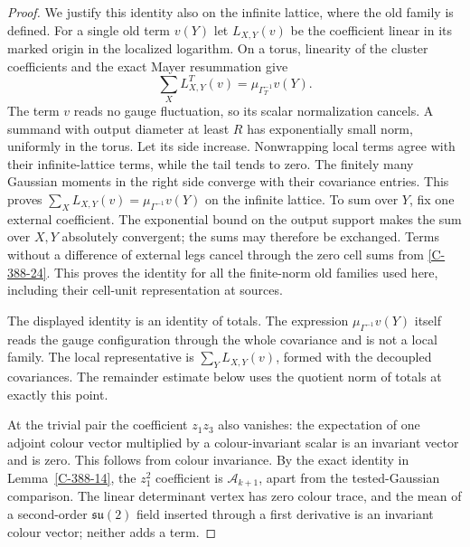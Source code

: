 \documentclass[11pt,letterpaper,reqno]{amsart}
\theoremstyle{definition}
\theoremstyle{remark}
\begin{document}
\begin{proof}
We justify this identity also on the infinite lattice,
where the old family is defined.  For a single old term
$v(Y)$ let $L_{X,Y}(v)$ be the coefficient linear in its
marked origin in the localized logarithm.  On a torus,
linearity of the cluster coefficients and the exact
Mayer resummation give
\[
 \sum_XL^T_{X,Y}(v)=\mu_{\Gamma_T^{-1}}v(Y).
\]
The term $v$ reads no gauge fluctuation, so its scalar
normalization cancels.  A summand with output diameter
at least $R$ has exponentially small norm, uniformly
in the torus.  Let its side increase.  Nonwrapping
local terms agree with their infinite-lattice terms,
while the tail tends to zero.  The finitely many
Gaussian moments in the right side converge with
their covariance entries.  This proves
$\sum_XL_{X,Y}(v)=\mu_{\Gamma^{-1}}v(Y)$ on the
infinite lattice.  To sum over $Y$, fix one external
coefficient.  The exponential bound on the output
support makes the sum over $X,Y$ absolutely convergent;
the sums may therefore be exchanged.  Terms without
a difference of external legs cancel through the
zero cell sums from \cref{C-388-24}.  This proves the
identity for all the finite-norm old families used here,
including their cell-unit representation at sources.

The displayed identity is an identity of totals.
The expression $\mu_{\Gamma^{-1}}v(Y)$ itself reads
the gauge configuration through the whole covariance
and is not a local family.  The local representative
is $\sum_YL_{X,Y}(v)$, formed with the decoupled
covariances.  The remainder estimate below uses the
quotient norm of totals at exactly this point.

At the trivial pair the coefficient $z_1z_3$ also vanishes:
the expectation of one adjoint colour vector multiplied
by a colour-invariant scalar is an invariant vector and
is zero.  This follows from colour invariance.  By the exact identity in
Lemma~\ref{C-388-14}, the $z_1^2$ coefficient is
$\mathscr A_{k+1}$, apart from the tested-Gaussian
comparison.  The linear determinant vertex has zero
colour trace, and the mean of a second-order
$\mathfrak{su}(2)$ field inserted through a first
derivative is an invariant colour vector; neither adds
a term.


\end{proof}
\end{document}
